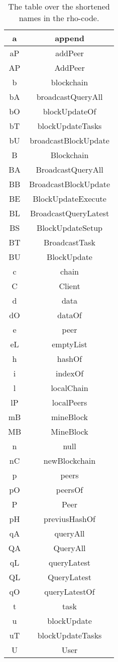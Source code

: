 \begin{table}
\begin{center}
\begin{tabular}{c|c}
a	&append					\\ \hline
aP	&addPeer				\\ \hline
AP	&AddPeer				\\ \hline
b	&blockchain				\\ \hline
bA	&broadcastQueryAll		\\ \hline
bO	&blockUpdateOf			\\ \hline
bT	&blockUpdateTasks		\\ \hline
bU	&broadcastBlockUpdate	\\ \hline
B	&Blockchain				\\ \hline
BA	&BroadcastQueryAll 		\\ \hline
BB	&BroadcastBlockUpdate 	\\ \hline
BE	&BlockUpdateExecute		\\ \hline
BL	&BroadcastQueryLatest 	\\ \hline
BS	&BlockUpdateSetup		\\ \hline
BT	&BroadcastTask			\\ \hline
BU	&BlockUpdate			\\ \hline
c	&chain					\\ \hline
C	&Client					\\ \hline
d	&data					\\ \hline
dO	&dataOf					\\ \hline
e	&peer					\\ \hline
eL	&emptyList				\\ \hline
h	&hashOf					\\ \hline
i	&indexOf				\\ \hline
l	&localChain				\\ \hline
lP	&localPeers				\\ \hline
mB	&mineBlock				\\ \hline
MB	&MineBlock				\\ \hline
n	&null					\\ \hline
nC	&newBlockchain			\\ \hline
p	&peers					\\ \hline
pO	&peersOf				\\ \hline
P	&Peer					\\ \hline
pH	&previusHashOf			\\ \hline
qA	&queryAll				\\ \hline
QA	&QueryAll				\\ \hline
qL	&queryLatest			\\ \hline
QL	&QueryLatest			\\ \hline
qO	&queryLatestOf			\\ \hline
t	&task					\\ \hline
u	&blockUpdate			\\ \hline
uT	&blockUpdateTasks		\\ \hline
U	&User					\\ \hline
\end{tabular}
\end{center}
\caption{The table over the shortened names in the rho-code.}
\label{tab:short}
\end{table}


